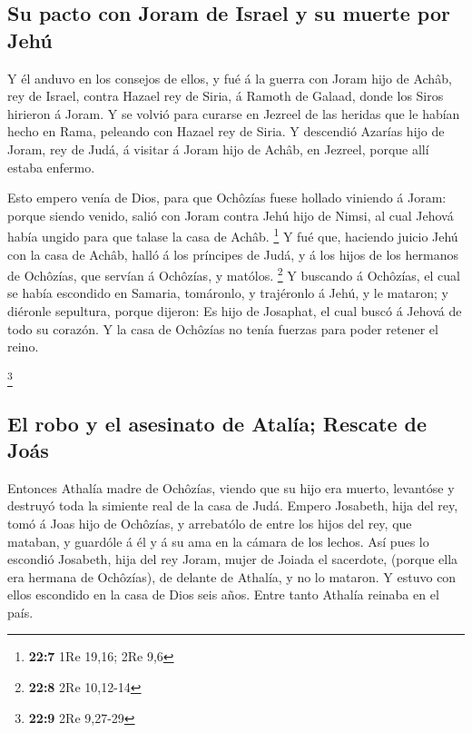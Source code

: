 \hypertarget{su-pacto-con-joram-de-israel-y-su-muerte-por-jehuxfa}{%
\subsection{Su pacto con Joram de Israel y su muerte por
Jehú}\label{su-pacto-con-joram-de-israel-y-su-muerte-por-jehuxfa}}

 Y él anduvo en los consejos de ellos, y fué á la guerra con
Joram hijo de Achâb, rey de Israel, contra Hazael rey de Siria, á Ramoth
de Galaad, donde los Siros hirieron á Joram.  Y se volvió
para curarse en Jezreel de las heridas que le habían hecho en Rama,
peleando con Hazael rey de Siria. Y descendió Azarías hijo de Joram, rey
de Judá, á visitar á Joram hijo de Achâb, en Jezreel, porque allí estaba
enfermo.

 Esto empero venía de Dios, para que Ochôzías fuese hollado
viniendo á Joram: porque siendo venido, salió con Joram contra Jehú hijo
de Nimsi, al cual Jehová había ungido para que talase la casa de Achâb.
\footnote{\textbf{22:7} 1Re 19,16; 2Re 9,6}  Y fué que,
haciendo juicio Jehú con la casa de Achâb, halló á los príncipes de
Judá, y á los hijos de los hermanos de Ochôzías, que servían á Ochôzías,
y matólos. \footnote{\textbf{22:8} 2Re 10,12-14}  Y buscando
á Ochôzías, el cual se había escondido en Samaria, tomáronlo, y
trajéronlo á Jehú, y le mataron; y diéronle sepultura, porque dijeron:
Es hijo de Josaphat, el cual buscó á Jehová de todo su corazón. Y la
casa de Ochôzías no tenía fuerzas para poder retener el reino.

\footnote{\textbf{22:9} 2Re 9,27-29}

\hypertarget{el-robo-y-el-asesinato-de-ataluxeda-rescate-de-jouxe1s}{%
\subsection{El robo y el asesinato de Atalía; Rescate de
Joás}\label{el-robo-y-el-asesinato-de-ataluxeda-rescate-de-jouxe1s}}

 Entonces Athalía madre de Ochôzías, viendo que su hijo era
muerto, levantóse y destruyó toda la simiente real de la casa de Judá.
 Empero Josabeth, hija del rey, tomó á Joas hijo de
Ochôzías, y arrebatólo de entre los hijos del rey, que mataban, y
guardóle á él y á su ama en la cámara de los lechos. Así pues lo
escondió Josabeth, hija del rey Joram, mujer de Joiada el sacerdote,
(porque ella era hermana de Ochôzías), de delante de Athalía, y no lo
mataron.  Y estuvo con ellos escondido en la casa de Dios
seis años. Entre tanto Athalía reinaba en el país.

